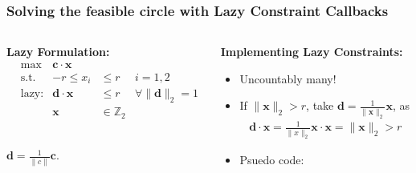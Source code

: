 \documentclass{beamer}
\begin{document}
\begin{frame}
  \frametitle{Solving the feasible circle with Lazy Constraint Callbacks}
  \begin{columns}
    \begin{column}[t]{.4\linewidth}
        {\bf Lazy Formulation:}
        \begin{align*}
          &\max& \mathbf c \cdot \mathbf x\\
          &\text{s.t.} &-r \leq x_i & \leq r& i= 1,2\\
          &\text{lazy:}& \mathbf d \cdot \mathbf x &\leq r & \forall \|\mathbf d\|_2 = 1 \\
          &&\mathbf x &\in \mathbb Z_2
        \end{align*}\pause
        \begin{center}
          
         \\
        $\mathbf d = \frac{1}{\|c\|} \mathbf c$.
        \end{center}
        
    \end{column}\pause
    \begin{column}[t]{.6\linewidth}      
  {\bf Implementing Lazy Constraints:}
  \begin{itemize}
  \item Uncountably many! \pause
  \item If $\|\mathbf x\|_2 > r$, take $\mathbf d = \frac{1}{\|\mathbf x\|_2}\mathbf x$, as 
    \begin{align*}
      \mathbf d \cdot \mathbf x =  \frac{1}{\|x\|_2}\mathbf x\cdot \mathbf x = \|\mathbf x\|_2 > r
    \end{align*}\pause
  \item Psuedo code:
    \begin{algorithm}[H]
    \end{algorithm}
    \end{itemize}
    \end{column}
  \end{columns}
  
\end{frame}
\end{document}
